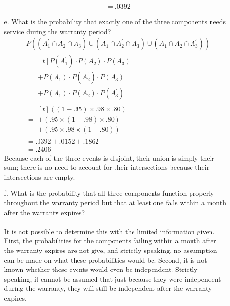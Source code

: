 \documentclass[letterpaper,12pt]{article}
\begin{document}
\begin{enumerate}
\begin{enumerate}
\begin{align*}
          &= .0392
        \end{align*}
      \item[e.]
        What is the probability that exactly one of the three components needs service during the warranty period?
        \begin{align*}
          &P((A_1^\prime \cap A_2 \cap A_3) \cup (A_1 \cap A_2^\prime \cap A_3) \cup (A_1 \cap A_2 \cap A_3^\prime)) \\
          &= \begin{aligned}[t]
            P(A_1^\prime) \cdot P(A_2) \cdot P(A_3) \\
            + P(A_1) \cdot P(A_2^\prime) \cdot P(A_3) \\
            + P(A_1) \cdot P(A_2) \cdot P(A_3^\prime)
          \end{aligned} \\
          &= \begin{aligned}[t]
            ((1 - .95) \times .98 \times .80) \\
            + (.95 \times (1 - .98) \times .80) \\
            + (.95 \times .98 \times (1 - .80))
          \end{aligned} \\
          &= .0392 + .0152 + .1862 \\
          &= .2406
        \end{align*}
        Because each of the three events is disjoint, their union is simply their sum; there is no need to account for their intersections because their intersections are empty.
      \item[f.]
        What is the probability that all three components function properly throughout the warranty period but that at least one fails within a month after the warranty expires?
        \\ \\
        It is not possible to determine this with the limited information given. First, the probabilities for the components failing within a month after the warranty expires are not give, and strictly speaking, no assumption can be made on what these probabilities would be. Second, it is not known whether these events would even be independent. Strictly speaking, it cannot be assumed that just because they were independent during the warranty, they will still be independent after the warranty expires.
    \end{enumerate}
\end{enumerate}
\end{document}

